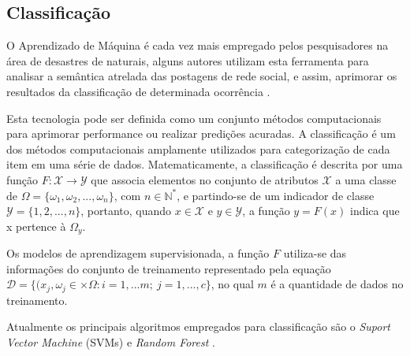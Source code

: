  \subsection{Classificação}
O Aprendizado de Máquina é cada vez mais empregado pelos pesquisadores na área de desastres de naturais, alguns autores utilizam esta ferramenta para analisar a semântica atrelada das postagens de rede social, e assim, aprimorar os resultados da classificação de determinada ocorrência \cite{de2015geographic, deparday2019machine}. 
\par Esta tecnologia pode ser definida como um conjunto métodos computacionais para aprimorar performance ou realizar predições acuradas. A classificação é um dos métodos computacionais amplamente utilizados para categorização de cada item em uma série de dados. Matematicamente, a classificação é descrita por uma função \(F: \mathcal{X}\longrightarrow \mathcal{Y}\) que associa elementos no conjunto de atributos \(\mathcal{X}\) a uma classe de \(\Omega=\{\omega_1, \omega_2,...,\omega_n\}\), com \(n \in \mathbb{N}^*\), e partindo-se de um indicador de classe \(\mathcal{Y}=\{1,2,...,n\}\), portanto, quando \(x \in \mathcal{X}\) e \(y \in \mathcal{Y}\), a função \(y=F(x)\) indica que x pertence à \(\Omega_y\).
\par Os modelos de aprendizagem supervisionada, a função \(F\) utiliza-se das informações do conjunto de treinamento representado pela equação \(\mathcal{D}=\{(x_j,\omega_j \in \times \Omega : i=1,...m; \ j=1,...,c \}\), no qual \(m \) é a quantidade de dados no treinamento.

\par Atualmente os principais algoritmos empregados para classificação são o \textit{Suport Vector Machine} (SVMs) e \textit{Random Forest} \cite{mohri2018foundations}.
